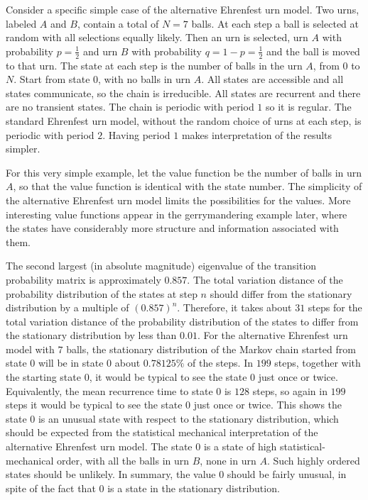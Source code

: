 \documentclass[12pt]{article}
\begin{document}
\begin{example}
    Consider a specific simple case of the alternative Ehrenfest urn
    model.%
    Two urns, labeled \( A \) and \( B \), contain a total of \( N = 7 \)
    balls.  At each step a ball is selected at random with all
    selections equally likely.  Then an urn is selected, urn \( A \)
    with probability \( p = \frac{1}{2} \) and urn \( B \) with
    probability \( q = 1-p = \frac {1}{2} \) and the ball is moved to
    that urn.  The state at each step is the number of balls in the urn \(
    A \), from \( 0 \) to \( N \). Start from state \( 0 \), with no
    balls in urn \( A \).    All states are
    accessible and all states communicate, so the chain is
    irreducible.  All states are recurrent and
    there are no transient states.  The chain is periodic with period \(
    1 \) so it is regular.  The standard Ehrenfest urn model, without
    the random choice of urns at each step, is periodic with period \( 2
    \). Having period \( 1 \) makes interpretation of the results
    simpler.

    For this very simple example, let the value function be the number
    of balls in urn \( A \), so that the value function is identical
    with the state number.  The simplicity of the alternative Ehrenfest
    urn model limits the possibilities for the values.  More interesting
    value functions appear in the gerrymandering example later, where
    the states have considerably more structure and information
    associated with them.

    The second largest (in absolute magnitude) eigenvalue of the
    transition probability matrix is approximately \( 0.857 \).  The
    total variation distance of the probability distribution of the
    states at step \( n \) should differ from the stationary
    distribution by a multiple of \( (0.857)^n \).  Therefore, it takes
    about \( 31 \) steps for the total variation distance of the
    probability distribution of the states to differ from the stationary
    distribution by less than \( 0.01 \).  For the alternative Ehrenfest
    urn model with \( 7 \) balls, the stationary distribution of the
    Markov chain started from state \( 0 \) will be in state \( 0 \)
    about \( 0.78125\% \) of the steps.  In \( 199 \) steps, together
    with the starting state \( 0 \), it would be typical to see the
    state \( 0 \) just once or twice.  Equivalently, the mean recurrence
    time to state \( 0 \) is \( 128 \) steps, so again in \( 199 \)
    steps it would be typical to see the state \( 0 \) just once or
    twice.  This shows the state \( 0 \) is an unusual state with
    respect to the stationary distribution, which should be expected
    from the statistical mechanical interpretation of the alternative
    Ehrenfest urn model.  The state \( 0 \) is a state of high
    statistical-mechanical order, with all the balls in urn \( B \),
    none in urn \( A \).  Such highly ordered states should be unlikely.
    In summary, the value \( 0 \) should be fairly unusual, in spite of
    the fact that \( 0 \) is a state in the stationary distribution.


\end{example}
\end{document}
